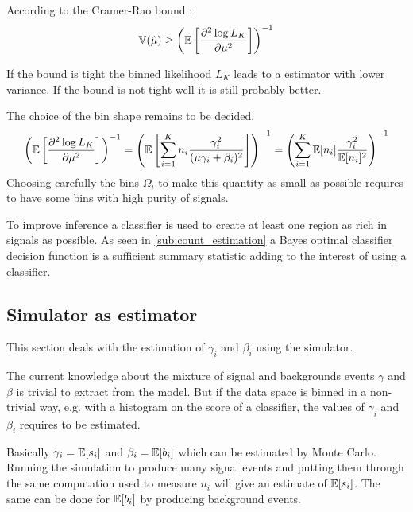 According to the Cramer-Rao bound :
\begin{equation}
    \mathbb{V}(\hat\mu) \geq \left (\mathbb{E} \left [ \frac{\partial^2 \log L_K}{\partial \mu^2}\right ] \right )^{-1}
\end{equation}

If the bound is tight the binned likelihood $L_K$ leads to a estimator with lower variance.
If the bound is not tight well it is still probably better.

The choice of the bin shape remains to be decided.
\begin{equation}
    \left (\mathbb{E} \left [ \frac{\partial^2 \log L_K}{\partial \mu^2}\right ] \right )^{-1} 
    	= \left ( \mathbb{E} \left [ \sum_{i=1}^K n_i \frac{\gamma_i^2}{(\mu \gamma_i + \beta_i)^2} \right ] \right )^{-1}
    	= \left ( \sum_{i=1}^K \mathbb{E} [n_i] \frac{\gamma_i^2}{\mathbb{E}[n_i]^2} \right )^{-1}
\end{equation}
Choosing carefully the bins $\Omega_i$ to make this quantity as small as possible requires to have some bins with high purity of signals.

To improve inference a classifier is used to create at least one region as rich in signals as possible.
As seen in \autoref{sub:count_estimation} a Bayes optimal classifier decision function is a sufficient summary statistic adding to the interest of using a classifier.






\subsection{Simulator as estimator} %
\label{sub:simulator_as_estimator}

This section deals with the estimation of $\gamma_i$ and $\beta_i$ using the simulator.


The current knowledge about the mixture of signal and backgrounds events $\gamma$ and $\beta$ is trivial to extract from the model.
But if the data space is binned in a non-trivial way, e.g. with a histogram on the score of a classifier, the values of $\gamma_i$ and $\beta_i$ requires to be estimated.

Basically $\gamma_i = \mathbb{E} [s_i]$ and $\beta_i = \mathbb{E} [b_i]$ which can be estimated by Monte Carlo.
Running the simulation to produce many signal events and putting them through the same computation used to measure $n_i$ will give an estimate of $\mathbb{E} [s_i]$.
The same can be done for $\mathbb{E} [b_i]$ by producing background events.


